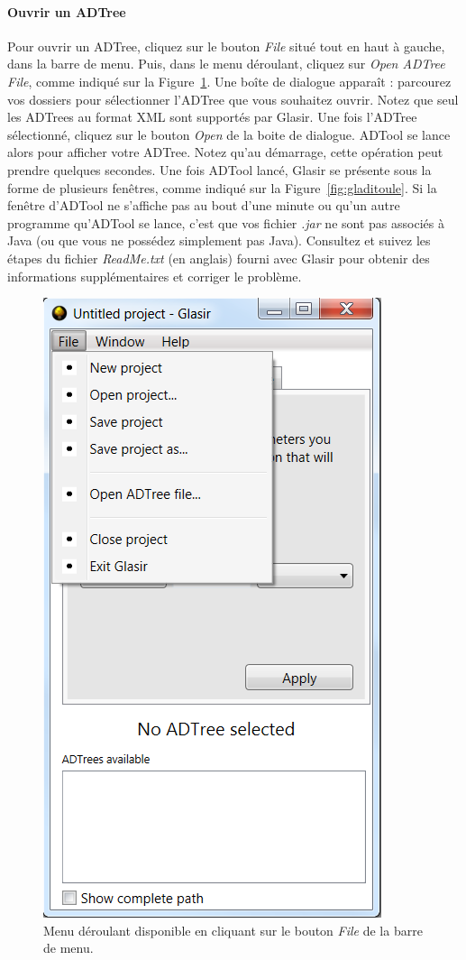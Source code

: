 \paragraph{Ouvrir un ADTree}
Pour ouvrir un ADTree, cliquez sur le bouton \emph{File} situé tout en haut à gauche, dans la barre de menu. Puis, dans le menu déroulant, cliquez sur \emph{Open ADTree File}, comme indiqué sur la {\sc Figure}~\ref{fig:file}. Une boîte de dialogue apparaît : parcourez vos dossiers pour sélectionner l'ADTree que vous souhaitez ouvrir. Notez que seul les ADTrees au format XML sont supportés par Glasir. Une fois l'ADTree sélectionné, cliquez sur le bouton \emph{Open} de la boite de dialogue. ADTool se lance alors pour afficher votre ADTree. Notez qu'au démarrage, cette opération peut prendre quelques secondes. Une fois ADTool lancé, Glasir se présente sous la forme de plusieurs fenêtres, comme indiqué sur la {\sc Figure}~\ref{fig:gladitoule}. Si la fenêtre d'ADTool ne s'affiche pas au bout d'une minute ou qu'un autre programme qu'ADTool se lance, c'est que vos fichier \emph{.jar} ne sont pas associés à Java (ou que vous ne possédez simplement pas Java). Consultez et suivez les étapes du fichier \emph{ReadMe.txt} (en anglais) fourni avec Glasir pour obtenir des informations supplémentaires et corriger le problème.

	\begin{figure}[!h]
        \centering
        \includegraphics[height=0.7\textwidth]{figure/openfile.png}
        \caption{Menu déroulant disponible en cliquant sur le bouton \emph{File} de la barre de menu.}
        \label{fig:file}
    \end{figure}
    
